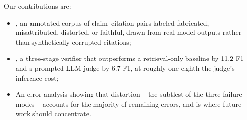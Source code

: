 \vspace{2pt}
\noindent Our contributions are:
\begin{itemize}[leftmargin=1.1em,itemsep=1pt,topsep=2pt]
  \item {}, an annotated corpus of claim--citation pairs
    labeled fabricated, misattributed, distorted, or faithful, drawn from
    real model outputs rather than synthetically corrupted citations;
  \item {}, a three-stage verifier that outperforms a
    retrieval-only baseline by 11.2 F1 and a prompted-LLM judge by 6.7 F1,
    at roughly one-eighth the judge's inference cost;
  \item An error analysis showing that distortion -- the subtlest of the
    three failure modes -- accounts for the majority of remaining errors,
    and is where future work should concentrate.
\end{itemize}
